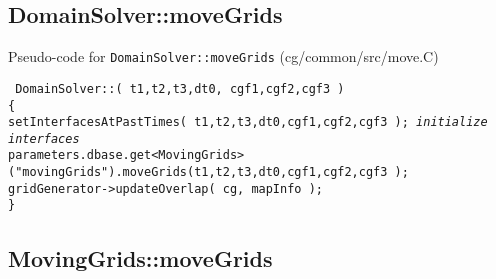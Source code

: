\documentclass[11pt]{article}
\begin{document}
\subsection{DomainSolver::moveGrids}\label{sec:DomainSolver::moveGrids}

Pseudo-code for {\tt DomainSolver::moveGrids} (cg/common/src/move.C)
\begin{flushleft}\tt\small
DomainSolver::( t1,t2,t3,dt0, cgf1,cgf2,cgf3 ) \\
\{  \\
\ia setInterfacesAtPastTimes( t1,t2,t3,dt0,cgf1,cgf2,cgf3 ); {\em initialize interfaces} \\
\ia parameters.dbase.get<MovingGrids>("movingGrids").moveGrids(t1,t2,t3,dt0,cgf1,cgf2,cgf3 ); \\
\ia gridGenerator->updateOverlap( cg, mapInfo );  \\
\}
\end{flushleft}

\subsection{MovingGrids::moveGrids}\label{sec:MovingGrids::moveGrids}
\end{document}
